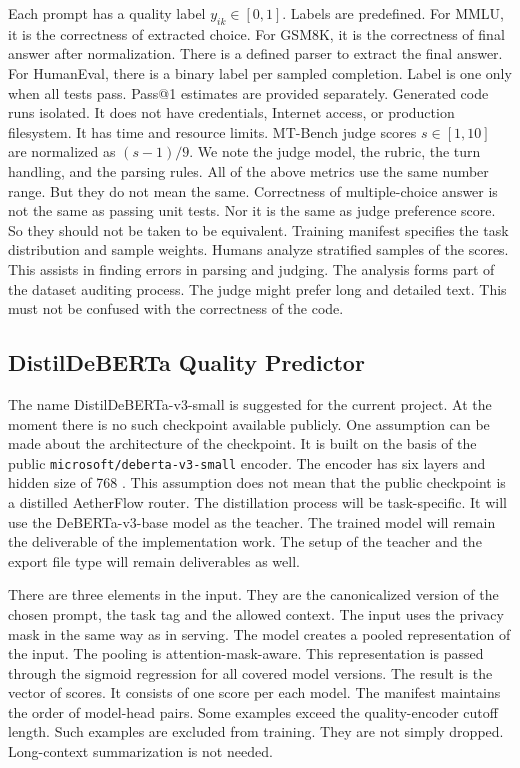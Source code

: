 \documentclass{FastFyp}
\begin{document}
Each prompt has a quality label $y_{ik}\in[0,1]$.
Labels are predefined.
For MMLU, it is the correctness of extracted choice.
For GSM8K, it is the correctness of final answer after normalization.
There is a defined parser to extract the final answer.
For HumanEval, there is a binary label per sampled completion.
Label is one only when all tests pass.
Pass@1 estimates are provided separately.
Generated code runs isolated.
It does not have credentials, Internet access, or production filesystem.
It has time and resource limits.
MT-Bench judge scores $s\in[1,10]$ are normalized as $(s-1)/9$.
We note the judge model, the rubric, the turn handling, and the parsing rules.
All of the above metrics use the same number range.
But they do not mean the same.
Correctness of multiple-choice answer is not the same as passing unit tests.
Nor it is the same as judge preference score.
So they should not be taken to be equivalent.
Training manifest specifies the task distribution and sample weights.
Humans analyze stratified samples of the scores.
This assists in finding errors in parsing and judging.
The analysis forms part of the dataset auditing process.
The judge might prefer long and detailed text.
This must not be confused with the correctness of the code.

\subsection{DistilDeBERTa Quality Predictor}
\label{subsec:predictor-assumptions}
The name DistilDeBERTa-v3-small is suggested for the current project.
At the moment there is no such checkpoint available publicly.
One assumption can be made about the architecture of the checkpoint.
It is built on the basis of the public \texttt{microsoft/deberta-v3-small} encoder.
The encoder has six layers and hidden size of 768 \cite{ref:DebertaSmall}.
This assumption does not mean that the public checkpoint is a distilled AetherFlow router.
The distillation process will be task-specific.
It will use the DeBERTa-v3-base model as the teacher.
The trained model will remain the deliverable of the implementation work.
The setup of the teacher and the export file type will remain deliverables as well.

There are three elements in the input.
They are the canonicalized version of the chosen prompt, the task tag and the allowed context.
The input uses the privacy mask in the same way as in serving.
The model creates a pooled representation of the input.
The pooling is attention-mask-aware.
This representation is passed through the sigmoid regression for all covered model versions.
The result is the vector of scores.
It consists of one score per each model.
The manifest maintains the order of model-head pairs.
Some examples exceed the quality-encoder cutoff length.
Such examples are excluded from training.
They are not simply dropped.
Long-context summarization is not needed.
\end{document}
